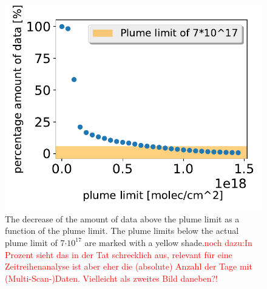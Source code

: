 \begin{figure}
	\centering
	\includegraphics[width=0.7\linewidth]{Bilder/percentage_minSO2}
	\caption{The decrease of the amount of data above the plume limit as a function of the plume limit. The plume limits below the actual plume limit of 7$\cdot10^{17}$ are marked with a yellow shade.\textcolor{red}{noch dazu:In Prozent sieht das in der Tat schrecklich aus, relevant für eine Zeitreihenanalyse ist aber eher die (absolute) Anzahl der Tage mit (Multi-Scan-)Daten. Vielleicht als zweites Bild daneben?! }}
	\label{fig:percentageminso2}
\end{figure}

